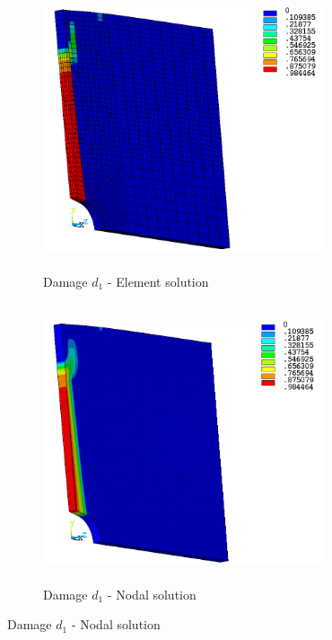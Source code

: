 \documentclass[12pt,twoside]{report}
\begin{document}
\begin{figure}[htbp!]
     \captionsetup[subfigure]{justification=centering}
     \begin{subfigure}[b]{0.4\textwidth}
         \includegraphics[width=8.3cm,height=8.2cm,keepaspectratio]{27.d1-lt-e.png}
         \caption{Damage $d_{1}$ - Element solution}
         \label{fig:d1-lt-e}
     \end{subfigure}
     \hspace{1.8cm}
     \begin{subfigure}[b]{0.4\textwidth}
         \includegraphics[width=8.3cm,height=8.2cm,keepaspectratio]{27.d1-lt-n.png}
         \caption{Damage $d_{1}$ - Nodal solution}
         \label{fig:d1-lt-n}
     \end{subfigure}
\end{figure}
\FloatBarrier
\end{document}
